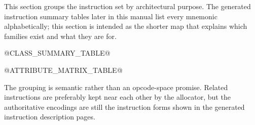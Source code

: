 This section groups the instruction set by architectural purpose. The generated instruction
summary tables later in this manual list every mnemonic alphabetically; this section is intended
as the shorter map that explains which families exist and what they are for.

@CLASS_SUMMARY_TABLE@

@ATTRIBUTE_MATRIX_TABLE@

The grouping is semantic rather than an opcode-space promise. Related instructions are preferably
kept near each other by the allocator, but the authoritative encodings are still the instruction
forms shown in the generated instruction description pages.
